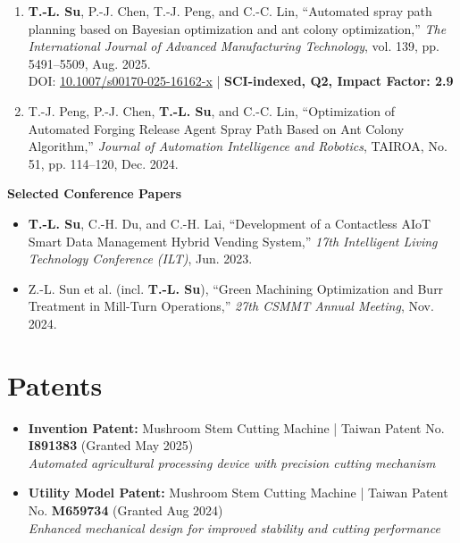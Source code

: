 \documentclass[11pt,a4paper]{article}
\begin{document}
\begin{enumerate}[leftmargin=*, itemsep=4pt]
    \item \textbf{T.-L. Su}, P.-J. Chen, T.-J. Peng, and C.-C. Lin, ``Automated spray path planning based on Bayesian optimization and ant colony optimization,'' \textit{The International Journal of Advanced Manufacturing Technology}, vol. 139, pp. 5491--5509, Aug. 2025.\\
    DOI: \href{https://doi.org/10.1007/s00170-025-16162-x}{10.1007/s00170-025-16162-x} | \textbf{SCI-indexed, Q2, Impact Factor: 2.9}

    \item T.-J. Peng, P.-J. Chen, \textbf{T.-L. Su}, and C.-C. Lin, ``Optimization of Automated Forging Release Agent Spray Path Based on Ant Colony Algorithm,'' \textit{Journal of Automation Intelligence and Robotics}, TAIROA, No. 51, pp. 114--120, Dec. 2024.
\end{enumerate}

\vspace{4pt}

\textbf{Selected Conference Papers}
\vspace{2pt}

\begin{itemize}[leftmargin=*, itemsep=2pt]
    \item \textbf{T.-L. Su}, C.-H. Du, and C.-H. Lai, ``Development of a Contactless AIoT Smart Data Management Hybrid Vending System,'' \textit{17th Intelligent Living Technology Conference (ILT)}, Jun. 2023.

    \item Z.-L. Sun et al. (incl. \textbf{T.-L. Su}), ``Green Machining Optimization and Burr Treatment in Mill-Turn Operations,'' \textit{27th CSMMT Annual Meeting}, Nov. 2024.
\end{itemize}

\section{Patents}
\vspace{2pt}

\begin{itemize}[leftmargin=*, itemsep=3pt]
    \item \textbf{Invention Patent:} Mushroom Stem Cutting Machine | Taiwan Patent No. \textbf{I891383} (Granted May 2025)\\
    \textit{Automated agricultural processing device with precision cutting mechanism}

    \item \textbf{Utility Model Patent:} Mushroom Stem Cutting Machine | Taiwan Patent No. \textbf{M659734} (Granted Aug 2024)\\
    \textit{Enhanced mechanical design for improved stability and cutting performance}
\end{itemize}
\end{document}
